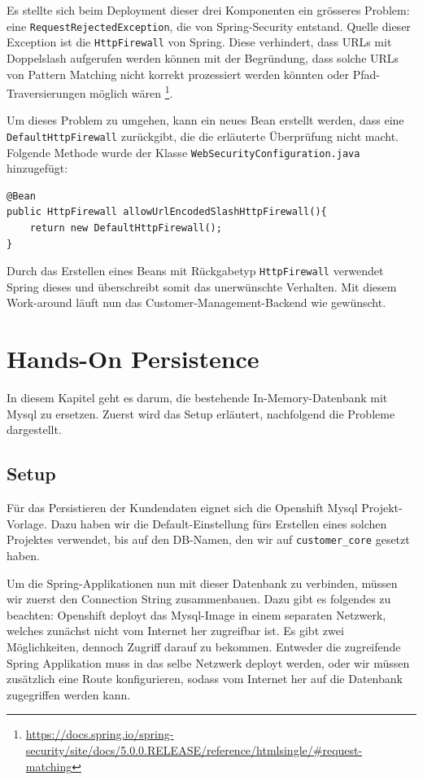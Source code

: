 \documentclass[12pt,a4paper]{article}
\begin{document}
Es stellte sich beim Deployment dieser drei Komponenten ein grösseres Problem: eine \texttt{RequestRejectedException}, die von Spring-Security entstand. Quelle dieser Exception ist die \texttt{HttpFirewall} von Spring. Diese verhindert, dass URLs mit Doppelslash aufgerufen werden können mit der Begründung, dass solche URLs von Pattern Matching nicht korrekt prozessiert werden könnten oder Pfad-Traversierungen möglich wären \footnote{\url{https://docs.spring.io/spring-security/site/docs/5.0.0.RELEASE/reference/htmlsingle/\#request-matching}}. 

Um dieses Problem zu umgehen, kann ein neues Bean erstellt werden, dass eine \texttt{DefaultHttpFirewall} zurückgibt, die die erläuterte Überprüfung nicht macht. Folgende Methode wurde der Klasse \texttt{Web\-Security\-Configuration.java} hinzugefügt:

\begin{lstlisting}
@Bean
public HttpFirewall allowUrlEncodedSlashHttpFirewall(){
	return new DefaultHttpFirewall();
}
\end{lstlisting}
Durch das Erstellen eines Beans mit Rückgabetyp \texttt{HttpFirewall} verwendet Spring dieses und überschreibt somit das unerwünschte Verhalten. Mit diesem Work-around läuft nun das Customer-Management-Backend wie gewünscht.

\section{Hands-On Persistence}
In diesem Kapitel geht es darum, die bestehende In-Memory-Datenbank mit Mysql zu ersetzen. Zuerst wird das Setup erläutert, nachfolgend die Probleme dargestellt. 

\subsection{Setup}

Für das Persistieren der Kundendaten eignet sich die Openshift Mysql Projekt-Vorlage. Dazu haben wir die Default-Einstellung fürs Erstellen eines solchen Projektes verwendet, bis auf den DB-Namen, den wir auf \texttt{customer\_core} gesetzt haben. 

Um die Spring-Applikationen nun mit dieser Datenbank zu verbinden, müssen wir zuerst den Connection String zusammenbauen. Dazu gibt es folgendes zu beachten: Openshift deployt das Mysql-Image in einem separaten Netzwerk, welches zunächst nicht vom Internet her zugreifbar ist. Es gibt zwei Möglichkeiten, dennoch Zugriff darauf zu bekommen. Entweder die zugreifende Spring Applikation muss in das selbe Netzwerk deployt werden, oder wir müssen zusätzlich eine Route konfigurieren, sodass vom Internet her auf die Datenbank zugegriffen werden kann. 
\end{document}
